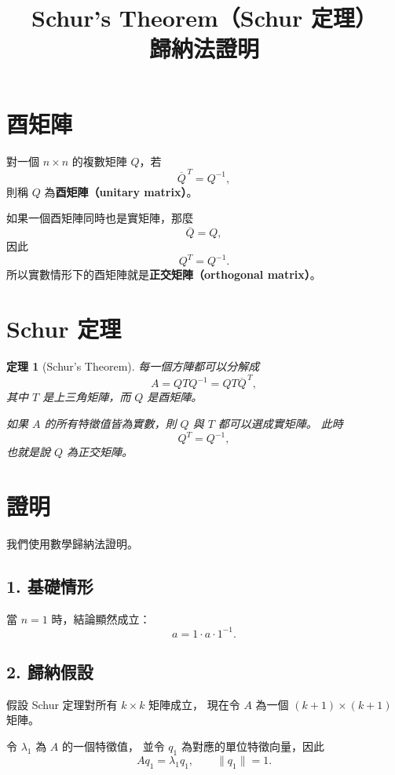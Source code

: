 \documentclass[12pt,a4paper]{article}
\title{\textbf{Schur's Theorem（Schur 定理）}\\
\large 歸納法證明}
\author{}
\date{}
\newtheorem{theorem}{定理}
\begin{document}
\maketitle

\section{酉矩陣}

對一個 $n\times n$ 的複數矩陣 $Q$，若
\[
    \overline{Q}^{\,T}=Q^{-1},
\]
則稱 $Q$ 為\textbf{酉矩陣（unitary matrix）}。

如果一個酉矩陣同時也是實矩陣，那麼
\[
    \overline{Q}=Q,
\]
因此
\[
    Q^T=Q^{-1}.
\]
所以實數情形下的酉矩陣就是\textbf{正交矩陣（orthogonal matrix）}。

\section{Schur 定理}

\begin{theorem}[Schur's Theorem]
    每一個方陣都可以分解成
    \[
        \boxed{
            A=QTQ^{-1}=QT\overline{Q}^{\,T},
        }
    \]
    其中 $T$ 是上三角矩陣，而 $Q$ 是酉矩陣。

    如果 $A$ 的所有特徵值皆為實數，則 $Q$ 與 $T$ 都可以選成實矩陣。
    此時
    \[
        Q^T=Q^{-1},
    \]
    也就是說 $Q$ 為正交矩陣。
\end{theorem}

\section{證明}

我們使用數學歸納法證明。

\subsection*{1. 基礎情形}

當 $n=1$ 時，結論顯然成立：
\[
    a=1\cdot a\cdot 1^{-1}.
\]

\subsection*{2. 歸納假設}

假設 Schur 定理對所有 $k\times k$ 矩陣成立，
現在令 $A$ 為一個 $(k+1)\times(k+1)$ 矩陣。

令 $\lambda_1$ 為 $A$ 的一個特徵值，
並令 $q_1$ 為對應的單位特徵向量，因此
\[
    Aq_1=\lambda_1q_1,
    \qquad
    \|q_1\|=1.
\]
\end{document}

